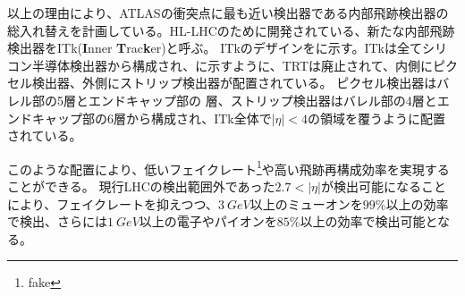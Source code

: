 以上の理由により、ATLASの衝突点に最も近い検出器である内部飛跡検出器の総入れ替えを計画している。HL-LHCのために開発されている、新たな内部飛跡検出器をITk(\textbf{I}nner \textbf{T}rac\textbf{k}er)と呼ぶ。
ITkのデザインをに示す。ITkは全てシリコン半導体検出器から構成され、に示すように、TRTは廃止されて、内側にピクセル検出器、外側にストリップ検出器が配置されている。
ピクセル検出器はバレル部の5層とエンドキャップ部の 層、ストリップ検出器はバレル部の4層とエンドキャップ部の6層から構成され、ITk全体で$|\eta|<4$の領域を覆うように配置されている。


このような配置により、低いフェイクレート\footnote{fake}や高い飛跡再構成効率を実現することができる。
現行LHCの検出範囲外であった$2.7<|\eta|$が検出可能になることにより、フェイクレートを抑えつつ、$3\ \si{GeV}$以上のミューオンを$99\si{\%}$以上の効率で検出、さらには$1\ \si{GeV}$以上の電子やパイオンを$85\si{\%}$以上の効率で検出可能となる。


\newpage
